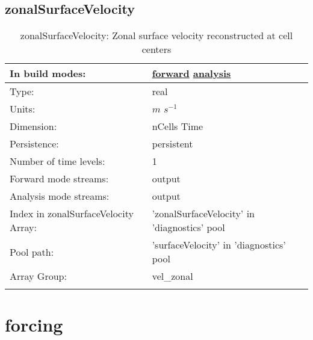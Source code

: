 \subsection[zonalSurfaceVelocity]{zonalSurfaceVelocity}
\label{subsec:var_sec_diagnostics_zonalSurfaceVelocity}
\begin{center}
\begin{longtable}{| p{2.0in} | p{4.0in} |}
        \hline 
        In build modes: & \hyperref[subsec:forward_var_tab_diagnostics]{forward} \hyperref[subsec:analysis_var_tab_diagnostics]{analysis} \\
        \hline 
        Type: & real \\
        \hline 
        Units: & $m$ $s^{-1}$ \\
        \hline 
        Dimension: & nCells Time \\
        \hline 
        Persistence: & persistent \\
        \hline 
        Number of time levels: & 1 \\
        \hline 
		 Forward mode streams: &  output \\
        \hline 
		 Analysis mode streams: &  output \\
        \hline 
		 Index in zonalSurfaceVelocity Array: & 'zonalSurfaceVelocity' in 'diagnostics' pool \\
		 \hline 
            Pool path: & 'surfaceVelocity' in 'diagnostics' pool
 \\
		 \hline 
		 Array Group: & vel\_zonal \\
		 \hline 
    \caption{zonalSurfaceVelocity: Zonal surface velocity reconstructed at cell centers}
\end{longtable}
\end{center}
\section[forcing]{forcing}
\label{sec:var_sec_forcing}
